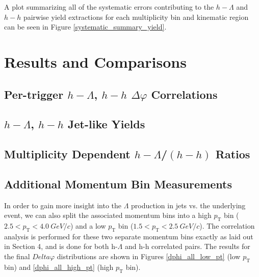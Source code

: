 \documentclass[ALICE,manyauthors]{ALICE_analysis_notes}
\begin{document}
A plot summarizing all of the systematic errors contributing to the $h-\Lambda$ and $h-h$ pairwise yield extractions for each multiplicity bin and kinematic region can be seen in Figure \ref{systematic_summary_yield}. 



\section{Results and Comparisons}
\label{results}
\subsection{Per-trigger $h-\Lambda$, $h-h$ $\Delta\varphi$ Correlations}
\subsection{$h-\Lambda$, $h-h$ Jet-like Yields}
\subsection{Multiplicity Dependent $h-\Lambda$/$(h-h)$ Ratios}
\subsection{Additional Momentum Bin Measurements}
In order to gain more insight into the $\Lambda$ production in jets vs. the underlying event, we can also split the associated momentum bins into a high $p_{\text{T}}$ bin ($2.5 < p_{\text{T}} < \SI{4.0}{GeV/c}$) and a low $p_{\text{T}}$ bin ($1.5 < p_{\text{T}} < \SI{2.5}{GeV/c}$).  The correlation analysis is performed for these two separate momentum bins exactly as laid out in Section 4, and is done for both h-$\Lambda$ and h-h correlated pairs. The results for the final $Delta\varphi$ distributions are shown in Figures \ref{dphi_all_low_pt} (low $p_{\text{T}}$ bin) and \ref{dphi_all_high_pt} (high $p_{\text{T}}$ bin).
\end{document}
